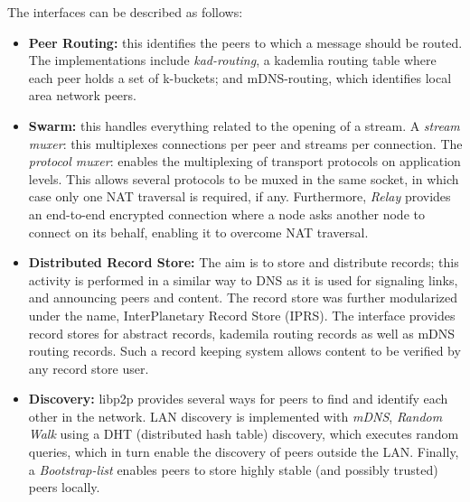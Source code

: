 \documentclass[conference]{IEEEtran}
\begin{document}
The interfaces can be described as follows:
\begin{itemize}
\item \textbf{Peer Routing:} this identifies the peers to which a message should be routed.
The implementations include \textit{kad-routing}, a kademlia routing table where each peer holds a set of k-buckets; and mDNS-routing, which identifies local area network peers.
\item \textbf{Swarm:} this handles everything related to the opening of a stream.
A \textit{stream muxer}: this multiplexes connections per peer and streams per connection.
The \textit{protocol muxer}: enables the multiplexing of transport protocols on application levels.
This allows several protocols to be muxed in the same socket, in which case only one NAT traversal is required, if any.
Furthermore, \textit{Relay} provides an end-to-end encrypted connection where a node asks another node to connect on its behalf, enabling it to overcome NAT traversal.
\item \textbf{Distributed Record Store:} The aim is to store and distribute records; this activity is performed in a similar way to DNS as it is used for signaling links, and announcing peers and content.
The record store was further modularized under the name, InterPlanetary Record Store (IPRS)\cite{iprs}.
The interface provides record stores for abstract records, kademila routing records as well as mDNS routing records. 
Such a record keeping system allows content to be verified by any record store user.
\item \textbf{Discovery:} libp2p provides several ways for peers to find and identify each other in the network.
LAN discovery is implemented with \textit{mDNS}, \textit{Random Walk} using a DHT (distributed hash table) discovery, which executes random queries, which in turn enable the discovery of peers outside the LAN. 
Finally, a \textit{Bootstrap-list} enables peers to store highly stable (and possibly trusted) peers locally.

\end{itemize}
\end{document}
